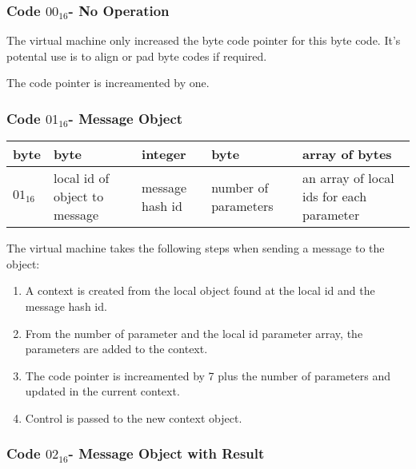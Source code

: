 \subsubsection{Code \texorpdfstring{$00_{16}$} -- No Operation}
The virtual machine only increased the byte code pointer for this byte code.
It's potental use is to align or pad byte codes if required.

The code pointer is increamented by one.

\subsubsection{Code \texorpdfstring{$01_{16}$} -- Message Object}

\begin{center}
  \begin{tabular}{|l|p{3cm}|p{3cm}|p{3cm}|p{3cm}|}
    \hline
    \textbf{byte} & \textbf{byte} & \textbf{integer} & \textbf{byte} &
    \textbf{array of bytes} \\
    \hline
    $01_{16}$ & local id of object to message & message hash id &
    number of parameters & an array of local ids for each parameter \\
    \hline
  \end{tabular}
\end{center}
The virtual machine takes the following steps when sending a message to the
object:
\begin{enumerate}
\item A context is created from the local object found at the local id and the
  message hash id.
\item From the number of parameter and the local id parameter array, the
  parameters are added to the context.
\item The code pointer is increamented by 7 plus the number of parameters and
  updated in the current context.
\item Control is passed to the new context object.
\end{enumerate}

\subsubsection{Code \texorpdfstring{$02_{16}$} -- Message Object with Result}

